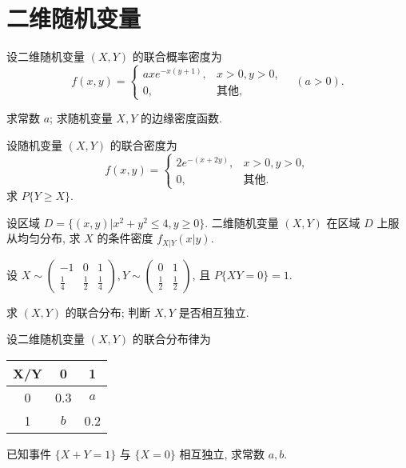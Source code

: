 \documentclass[padp]{ExBook}
\begin{document}
\section{二维随机变量}
\begin{qitems}

    \begin{bbox}
        \qitem 设二维随机变量 $(X,Y)$ 的联合概率密度为
        $$ f(x,y) = \begin{cases} axe^{-x(y+1)}, & x>0, y>0, \\ 0, & \text{其他}, \end{cases} \quad (a>0). $$
        \begin{subqitems}
            \subqitem 求常数 $a$;
            \subqitem 求随机变量 $X, Y$ 的边缘密度函数.
        \end{subqitems}
    \end{bbox}

    \begin{bbox}
        \qitem 设随机变量 $(X,Y)$ 的联合密度为
        $$ f(x,y) = \begin{cases} 2e^{-(x+2y)}, & x>0, y>0, \\ 0, & \text{其他}. \end{cases} $$
        求 $P\{Y \ge X\}$.
    \end{bbox}

    \begin{bbox}
        \qitem 设区域 $D = \{(x,y) | x^2+y^2 \le 4, y \ge 0\}$. 二维随机变量 $(X,Y)$ 在区域 $D$ 上服从均匀分布, 求 $X$ 的条件密度 $f_{X|Y}(x|y)$.
    \end{bbox}

    \begin{bbox}
        \qitem 设 $X \sim \begin{pmatrix} -1 & 0 & 1 \\ \frac{1}{4} & \frac{1}{2} & \frac{1}{4} \end{pmatrix}, Y \sim \begin{pmatrix} 0 & 1 \\ \frac{1}{2} & \frac{1}{2} \end{pmatrix}$, 且 $P\{XY=0\}=1$.
        \begin{subqitems}
            \subqitem 求 $(X,Y)$ 的联合分布;
            \subqitem 判断 $X,Y$ 是否相互独立.
        \end{subqitems}
    \end{bbox}

    \begin{bbox}
        \qitem 设二维随机变量 $(X,Y)$ 的联合分布律为
        \begin{center}
        \begin{tabular}{|c|c|c|}
        \hline
        X/Y & 0 & 1 \\
        \hline
        0 & 0.3 & $a$ \\
        \hline
        1 & $b$ & 0.2 \\
        \hline
        \end{tabular}
        \end{center}
        已知事件 $\{X+Y=1\}$ 与 $\{X=0\}$ 相互独立, 求常数 $a, b$.
    \end{bbox}
    

\end{qitems}
\end{document}
